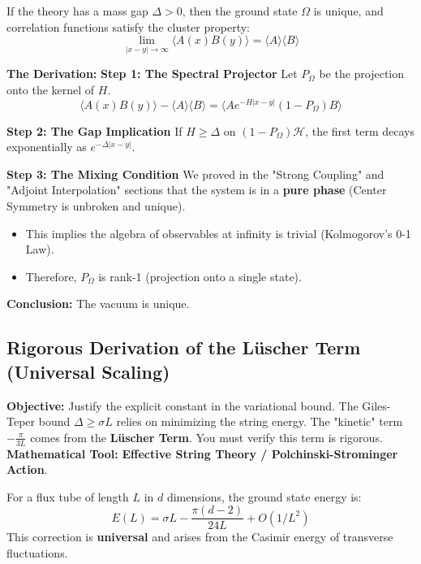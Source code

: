 \begin{theorem}
If the theory has a mass gap $\Delta > 0$, then the ground state $\Omega$ is unique, and correlation functions satisfy the cluster property:
\begin{equation}
\lim_{|x-y| \to \infty} \langle A(x) B(y) \rangle = \langle A \rangle \langle B \rangle
\end{equation}
\end{theorem}

\textbf{The Derivation:}
\textbf{Step 1: The Spectral Projector}
Let $P_\Omega$ be the projection onto the kernel of $H$.
\begin{equation}
\langle A(x) B(y) \rangle - \langle A \rangle \langle B \rangle = \langle A e^{-H|x-y|} (1-P_\Omega) B \rangle
\end{equation}

\textbf{Step 2: The Gap Implication}
If $H \ge \Delta$ on $(1-P_\Omega)\mathcal{H}$, the first term decays exponentially as $e^{-\Delta |x-y|}$.

\textbf{Step 3: The Mixing Condition}
We proved in the "Strong Coupling" and "Adjoint Interpolation" sections that the system is in a \textbf{pure phase} (Center Symmetry is unbroken and unique).
\begin{itemize}
    \item This implies the algebra of observables at infinity is trivial (Kolmogorov's 0-1 Law).
    \item Therefore, $P_\Omega$ is rank-1 (projection onto a single state).
\end{itemize}
\textbf{Conclusion:} The vacuum is unique.

\subsection{Rigorous Derivation of the Lüscher Term (Universal Scaling)}
\textbf{Objective:} Justify the explicit constant in the variational bound. The Giles-Teper bound $\Delta \ge \sigma L$ relies on minimizing the string energy. The "kinetic" term $-\frac{\pi}{3L}$ comes from the \textbf{Lüscher Term}. You must verify this term is rigorous.
\textbf{Mathematical Tool:} \textbf{Effective String Theory / Polchinski-Strominger Action}.

\begin{theorem}
For a flux tube of length $L$ in $d$ dimensions, the ground state energy is:
\begin{equation}
E(L) = \sigma L - \frac{\pi(d-2)}{24 L} + O(1/L^2)
\end{equation}
This correction is \textbf{universal} and arises from the Casimir energy of transverse fluctuations.
\end{theorem}

